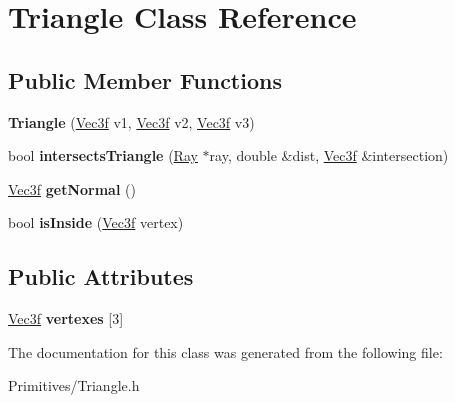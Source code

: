 \hypertarget{class_triangle}{}\section{Triangle Class Reference}
\label{class_triangle}
\subsection*{Public Member Functions}
\begin{DoxyCompactItemize}
\item 
\mbox{\label{class_triangle_a957d1aac1f44095d3b849dec4b29811d}} 
{\bfseries Triangle} (\hyperlink{struct_vec3f}{Vec3f} v1, \hyperlink{struct_vec3f}{Vec3f} v2, \hyperlink{struct_vec3f}{Vec3f} v3)
\item 
\mbox{\label{class_triangle_a02e91bfd0661f04c2e00f102cb631ce6}} 
bool {\bfseries intersects\+Triangle} (\hyperlink{class_ray}{Ray} $\ast$ray, double \&dist, \hyperlink{struct_vec3f}{Vec3f} \&intersection)
\item 
\mbox{\label{class_triangle_a33843d66b788da0412d1ae4f882fb3dd}} 
\hyperlink{struct_vec3f}{Vec3f} {\bfseries get\+Normal} ()
\item 
\mbox{\label{class_triangle_a047f9cc901b2bd5af54fa5c2c573ba66}} 
bool {\bfseries is\+Inside} (\hyperlink{struct_vec3f}{Vec3f} vertex)
\end{DoxyCompactItemize}
\subsection*{Public Attributes}
\begin{DoxyCompactItemize}
\item 
\mbox{\label{class_triangle_aac61b1f710b7719f98177d68f60b3fea}} 
\hyperlink{struct_vec3f}{Vec3f} {\bfseries vertexes} \mbox{[}3\mbox{]}
\end{DoxyCompactItemize}


The documentation for this class was generated from the following file\+:\begin{DoxyCompactItemize}
\item 
Primitives/Triangle.\+h\end{DoxyCompactItemize}
